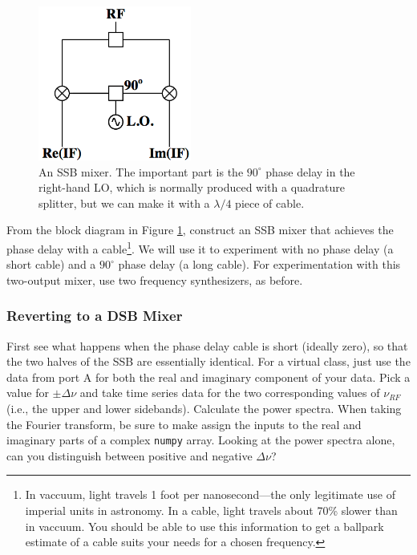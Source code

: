 \documentclass[11pt,preprint]{aastex}
\begin{document}
\begin{figure}[h!]
\begin{center}
  \includegraphics[height=2in]{ssbmixer.png}
\end{center}
\caption{\footnotesize An SSB mixer. The important part is the
  $90^\circ$ phase delay in the right-hand LO, which is normally
  produced with a quadrature splitter, but we can make it
  with a $\lambda/4$ piece of cable. \label{ssb}}
\end{figure}

From the block diagram in Figure \ref{ssb}, construct an SSB mixer that
achieves the phase delay with a cable\footnote{In vaccuum, light travels
1 foot per nanosecond---the only legitimate use of
imperial units in astronomy. In a cable, light travels about
70\% slower than in vaccuum. You should be able to use this information
to get a ballpark estimate of a cable suits your
needs for a chosen frequency.}. We will use
it to experiment with no phase delay (a short cable) and a $90^\circ$
phase delay (a long cable).  For experimentation with this two-output
mixer, use two frequency synthesizers, as before.

\subsubsection{Reverting to a DSB Mixer} \label{dsbmixer}

\noindent
First see what happens when the phase delay cable is short (ideally
zero), so that the two halves of the SSB are essentially identical.
{\color{red} For a virtual class, just use the data from port A for both
the real and imaginary component of your data.}
Pick a value for $\pm\Delta\nu$ and take time
series data for the two corresponding values of $\nu_{RF}$ (i.e., the
upper and lower sidebands). Calculate the power spectra. When taking the
Fourier transform, be sure to make assign the inputs to the real and imaginary
parts of a complex {\tt numpy} array.
Looking at the power spectra alone, can you distinguish between positive and negative $\Delta
\nu$?
\end{document}
